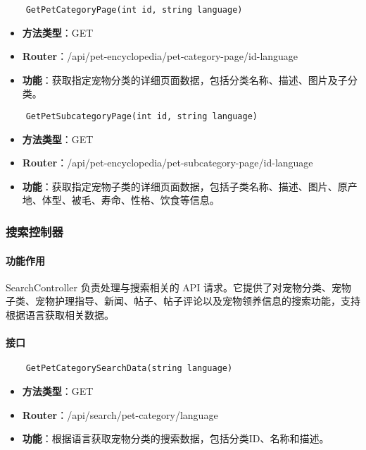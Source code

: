 \begin{verbatim}
	GetPetCategoryPage(int id, string language)
\end{verbatim}

\begin{itemize}
	\item \textbf{方法类型}：GET
	\item \textbf{Router}：/api/pet-encyclopedia/pet-category-page/{id}-{language}
	\item \textbf{功能}：获取指定宠物分类的详细页面数据，包括分类名称、描述、图片及子分类。
\end{itemize}

\begin{verbatim}
	GetPetSubcategoryPage(int id, string language)
\end{verbatim}

\begin{itemize}
	\item \textbf{方法类型}：GET
	\item \textbf{Router}：/api/pet-encyclopedia/pet-subcategory-page/{id}-{language}
	\item \textbf{功能}：获取指定宠物子类的详细页面数据，包括子类名称、描述、图片、原产地、体型、被毛、寿命、性格、饮食等信息。
\end{itemize}

\subsubsection{搜索控制器}

\paragraph{功能作用}

SearchController 负责处理与搜索相关的 API 请求。它提供了对宠物分类、宠物子类、宠物护理指导、新闻、帖子、帖子评论以及宠物领养信息的搜索功能，支持根据语言获取相关数据。

\paragraph{接口}

\begin{verbatim}
	GetPetCategorySearchData(string language)
\end{verbatim}

\begin{itemize}
	\item \textbf{方法类型}：GET
	\item \textbf{Router}：/api/search/pet-category/{language}
	\item \textbf{功能}：根据语言获取宠物分类的搜索数据，包括分类ID、名称和描述。
\end{itemize}

